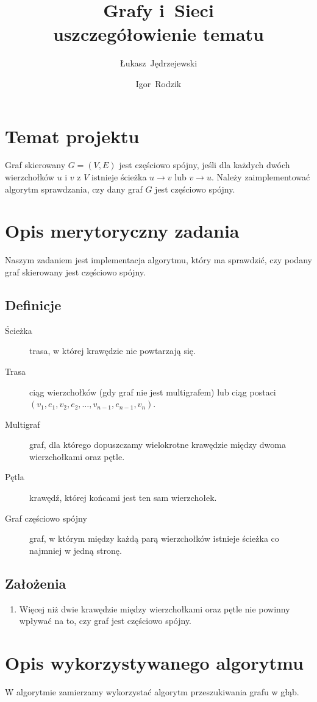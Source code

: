 \documentclass[a4paper,12pt]{mwart}
\title{
	Grafy i~Sieci \\
    uszczegółowienie tematu
}
\author{
	Łukasz~Jędrzejewski
    \and
	Igor~Rodzik
}
\date{}
\begin{document}
\maketitle

\section{Temat projektu}

Graf skierowany $G=(V,E)$ jest częściowo spójny, jeśli dla każdych dwóch
wierzchołków $u$ i $v$ z $V$ istnieje ścieżka $u \to v$ lub $v \to u$. Należy
zaimplementować algorytm sprawdzania, czy dany graf $G$ jest częściowo spójny.

\section{Opis merytoryczny zadania}

Naszym zadaniem jest implementacja algorytmu, który ma sprawdzić, czy podany
graf skierowany jest częściowo spójny.

\subsection{Definicje}

\begin{description}
	\item[Ścieżka] trasa, w której krawędzie nie powtarzają się.
	\item[Trasa] ciąg wierzchołków (gdy graf nie jest multigrafem) lub ciąg
		postaci $(v_1,e_1,v_2,e_2,\ldots, v_{n-1}, e_{n-1}, v_n)$.
	\item[Multigraf] graf, dla którego dopuszczamy wielokrotne krawędzie między
		dwoma wierzchołkami oraz pętle.
	\item[Pętla] krawędź, której końcami jest ten sam wierzchołek.
	\item[Graf częściowo spójny] graf, w którym między każdą parą wierzchołków
		istnieje ścieżka co najmniej w jedną stronę.
\end{description}

\subsection{Założenia}

\begin{enumerate}
	\item Więcej niż dwie krawędzie między wierzchołkami oraz pętle nie powinny
		wpływać na to, czy graf jest częściowo spójny.
\end{enumerate}

\section{Opis wykorzystywanego algorytmu}

W algorytmie zamierzamy wykorzystać algorytm przeszukiwania grafu w głąb.
\end{document}
